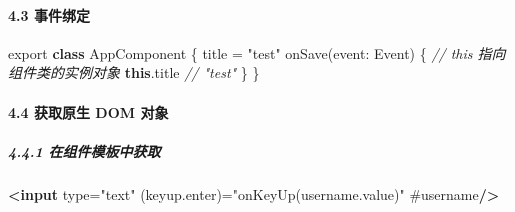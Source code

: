 \documentclass[
]{article}
\newenvironment{Shaded}{}{}
\newcommand{\AttributeTok}[1]{\textcolor[rgb]{0.49,0.56,0.16}{#1}}
\newcommand{\BuiltInTok}[1]{#1}
\newcommand{\CommentTok}[1]{\textcolor[rgb]{0.38,0.63,0.69}{\textit{#1}}}
\newcommand{\DataTypeTok}[1]{\textcolor[rgb]{0.56,0.13,0.00}{#1}}
\newcommand{\FunctionTok}[1]{\textcolor[rgb]{0.02,0.16,0.49}{#1}}
\newcommand{\ImportTok}[1]{#1}
\newcommand{\KeywordTok}[1]{\textcolor[rgb]{0.00,0.44,0.13}{\textbf{#1}}}
\newcommand{\NormalTok}[1]{#1}
\newcommand{\OperatorTok}[1]{\textcolor[rgb]{0.40,0.40,0.40}{#1}}
\newcommand{\OtherTok}[1]{\textcolor[rgb]{0.00,0.44,0.13}{#1}}
\newcommand{\StringTok}[1]{\textcolor[rgb]{0.25,0.44,0.63}{#1}}
\begin{document}
\hypertarget{43-ux4e8bux4ef6ux7ed1ux5b9a}{%
\paragraph{4.3 事件绑定}\label{43-ux4e8bux4ef6ux7ed1ux5b9a}}

\begin{Shaded}
\end{Shaded}

\begin{Shaded}
\begin{Highlighting}[]
\ImportTok{export} \KeywordTok{class}\NormalTok{ AppComponent \{}
\NormalTok{  title }\OperatorTok{=} \StringTok{"test"}
  \FunctionTok{onSave}\NormalTok{(}\DataTypeTok{event}\OperatorTok{:} \BuiltInTok{Event}\NormalTok{) \{}
    \CommentTok{// this 指向组件类的实例对象}
    \KeywordTok{this}\OperatorTok{.}\AttributeTok{title} \CommentTok{// "test"}
\NormalTok{  \}}
\NormalTok{\}}
\end{Highlighting}
\end{Shaded}

\hypertarget{44-ux83b7ux53d6ux539fux751f-dom-ux5bf9ux8c61}{%
\paragraph{4.4 获取原生 DOM
对象}\label{44-ux83b7ux53d6ux539fux751f-dom-ux5bf9ux8c61}}

\hypertarget{441-ux5728ux7ec4ux4ef6ux6a21ux677fux4e2dux83b7ux53d6}{%
\subparagraph{4.4.1
在组件模板中获取}\label{441-ux5728ux7ec4ux4ef6ux6a21ux677fux4e2dux83b7ux53d6}}

\begin{Shaded}
\begin{Highlighting}[]
\KeywordTok{\textless{}input}\OtherTok{ type=}\StringTok{"text"}\OtherTok{ (keyup.enter)=}\StringTok{"onKeyUp(username.value)"}\OtherTok{ \#username}\KeywordTok{/\textgreater{}}
\end{Highlighting}
\end{Shaded}
\end{document}

